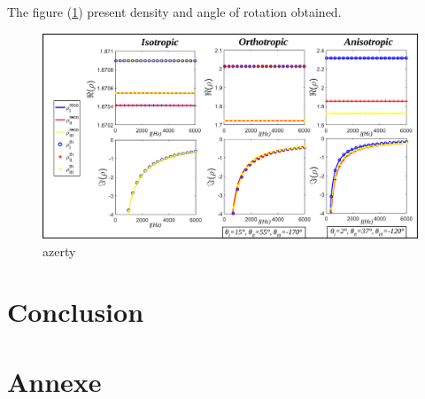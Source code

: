 \documentclass{article}
\begin{document}
    The figure (\ref{Grph_rho_dir}) present density and angle of rotation obtained.

    \begin{figure}[ht!]
        \centering
        \includegraphics[scale=0.4]{Density_dir.png}
        \caption{azerty}
        \label{Grph_rho_dir}
    \end{figure}
    
    
    
\section{Conclusion}


\section{Annexe}
\end{document}
